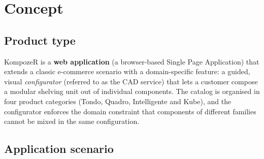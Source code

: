 \section{Concept}\label{concept}

\subsection{Product type}

KompozeR is a \textbf{web application} (a browser-based Single Page Application)
that extends a classic e-commerce scenario with a domain-specific
feature: a guided, visual \emph{configurator} (referred to as the CAD service)
that lets a customer compose a modular shelving unit out of individual
components. The catalog is organised in four product
categories (Tondo, Quadro, Intelligente and Kube), and the configurator enforces the domain
constraint that components of different families cannot be mixed in the same
configuration.

\subsection{Application scenario}

